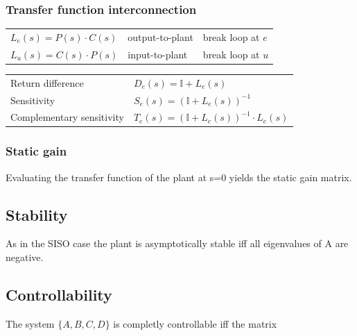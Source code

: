 \documentclass[10pt,a4paper]{scrartcl}
\begin{document}
\begin{multicols*}{3}
	\subsubsection{Transfer function interconnection}
	
	
	
	\begin{tabular}{lll}
	$L_e(s)=P(s)\cdot C(s)$&output-to-plant&break loop at $e$\\
	$L_u(s)=C(s)\cdot P(s)$&input-to-plant&break loop at $u$\\
	\end{tabular}
	
	
	\finn
	
	\begin{tabular}{l@{  :  }l}
	Return difference&$D_e(s)=\mathbb{I}+L_e(s)$\\
	Sensitivity&$S_e(s)=(\mathbb{I}+L_e(s))^{-1}$\\
	Complementary sensitivity& $T_e(s)=(\mathbb{I}+L_e(s))^{-1}\cdot L_e(s)$
	\end{tabular}
	
	\subsubsection{Static gain}
	
	Evaluating the transfer function of the plant at s=0 yields the static gain matrix.
	
	\subsection{Stability}
	
	As in the SISO case the plant is asymptotically stable iff all eigenvalues of A are negative.
		
	\subsection{Controllability}
	
	The system $\{A,B,C,D\}$ is completly controllable iff the matrix
	
	

\end{multicols*}
\end{document}
